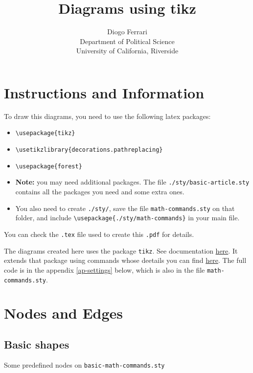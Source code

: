 \documentclass[a4paper]{article}
\author{Diogo Ferrari\\
Department of Political Science\\
University of California, Riverside\\
}
\date{}
\title{Diagrams using tikz}
\begin{document}
\maketitle
\tableofcontents

\pagebreak
\section{Instructions and Information}
\label{sec:org0a9bab6}

To draw this diagrams, you need to use the following latex packages:
\begin{itemize}
\item \texttt{\textbackslash{}usepackage\{tikz\}}
\item \texttt{\textbackslash{}usetikzlibrary\{decorations.pathreplacing\}}
\item \texttt{\textbackslash{}usepackage\{forest\}}
\item \textbf{Note:} you may need additional packages. The file \texttt{./sty/basic-article.sty} contains all the packages you need and some extra ones.
\item You also need to create \texttt{./sty/}, save the file \texttt{math-commands.sty} on that folder, and include \texttt{\textbackslash{}usepackage\{./sty/math-commands\}} in your main file.
\end{itemize}

You can check the \texttt{.tex} file used to create this \texttt{.pdf} for details.

The diagrams created here uses the package \texttt{tikz}. See documentation \href{https://ctan.org/pkg/pgf?lang=en}{here}. It extends that package using commands whose deetails you can find \href{https://github.com/jluttine/tikz-bayesnet}{here}. The full code is in the appendix \ref{ap-settings} below, which is also in the file \texttt{math-commands.sty}.


\pagebreak
\section{Nodes and Edges}
\label{sec:orgf0508ee}
\subsection{Basic shapes}
\label{sec:org4c9d199}
Some predefined nodes on \texttt{basic-math-commands.sty}
\end{document}
